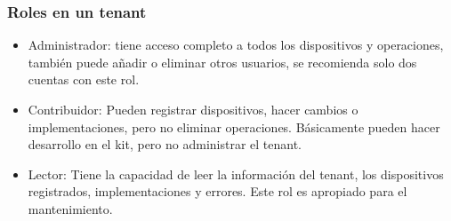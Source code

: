 \subsubsection{Roles en un tenant}
\begin{itemize}
	\item 
	Administrador: tiene acceso completo a todos los dispositivos y operaciones, también puede añadir o eliminar otros usuarios, se recomienda solo dos cuentas con este rol.
	\item 
	Contribuidor: Pueden registrar dispositivos, hacer cambios o implementaciones, pero no eliminar operaciones. Básicamente pueden hacer desarrollo en el kit, pero no administrar el tenant.
	\item 
	Lector: Tiene la capacidad de leer la información del tenant, los dispositivos registrados, implementaciones y errores. Este rol es apropiado para el mantenimiento.
	
\end{itemize}